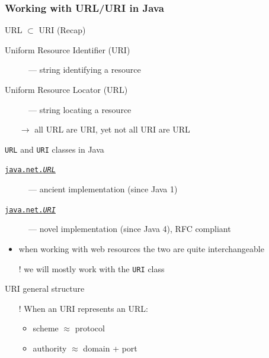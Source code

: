 \documentclass[presentation]{beamer}\mode<presentation>{\usetheme{AMSBolognaFC}}
\begin{document}
\begin{frame}[allowframebreaks]
    \frametitle{Working with URL/URI in Java}

    \begin{block}{URL $\subset$ URI (Recap)}
        \begin{description}
            \item[Uniform Resource Identifier (URI)] --- string \alert{identifying} a resource
            \item[Uniform Resource Locator (URL)] --- string \alert{locating} a resource
        \end{description}
        \begin{itemize}
            \item[$\rightarrow$] all URL are URI, yet not all URI are URL
        \end{itemize}
    \end{block}

    \begin{block}{\texttt{URL} and \texttt{URI} classes in Java}
        \begin{description}
            \item[\href{https://docs.oracle.com/en/java/javase/15/docs/api/java.base/java/net/URL.html}{\texttt{java.net.\textit{URL}}}] --- ancient implementation (since Java 1)
            \item[\href{https://docs.oracle.com/en/java/javase/15/docs/api/java.base/java/net/URI.html}{\texttt{java.net.\textit{URI}}}] --- novel implementation (since Java 4), RFC compliant
        \end{description}
        \begin{itemize}
            \item when working with web resources the two are quite interchangeable
            \item[!] we will mostly work with the \texttt{URI} class
        \end{itemize}
    \end{block}

    \begin{block}{URI general structure}
        \begin{center}\ttfamily
            [scheme:][//authority][path][?query][\#fragment]
        \end{center}

        \begin{itemize}
            \item[!] When an URI represents an URL:
            \begin{itemize}
                \item scheme $\approx$ protocol
                \item authority $\approx$ domain + port
            \end{itemize}
        \end{itemize}
    \end{block}


\end{frame}
\end{document}
